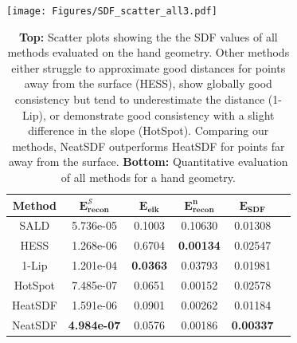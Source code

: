 \documentclass[draft,12pt,openany]{book}
\theoremstyle{plainnormal}
\theoremstyle{remark}
\begin{document}
\begin{table}
\hspace*{-0.3cm}
\texttt{[image: Figures/SDF\_scatter\_all3.pdf]}
\vspace*{0.5cm}  %
    \par  %
        \begin{tabular}{cccccc}
        \toprule
        \textbf{Method} &$\mathbf{E_{recon}^{\mathcal{S}}}$ & $\mathbf{E_{eik}}$ &$\mathbf{E_{recon}^n}$ & $\mathbf{E_{SDF}}$\\ 
        \midrule
        SALD & 5.736e-05 &  0.1003 & 0.10630 & 0.01308\\ %
        HESS & 1.268e-06  &  0.6704 &\textbf{0.00134} &0.02547   \\ 
        1-Lip   & 1.201e-04   & \textbf{0.0363} &0.03793&0.01981\\  %
        HotSpot  &7.485e-07 &   0.0651 & 0.00152 &  0.02578\\  %
        \midrule
        HeatSDF & 1.591e-06  & 0.0901 &  0.00262&0.01184\\  %
        
        NeatSDF & \textbf{4.984e-07} & 0.0576 & 0.00186 & \textbf{0.00337} \\%
        \bottomrule
    \end{tabular}
    \caption{\textbf{Top:} Scatter plots showing the the SDF values of all methods evaluated on the hand geometry. Other methods either struggle to approximate good distances for points away from the surface (HESS), show globally good consistency but tend to underestimate the distance (1-Lip), or demonstrate good consistency with a slight difference in the slope (HotSpot). Comparing our methods, NeatSDF outperforms HeatSDF for points far away from the surface. \textbf{Bottom:} Quantitative evaluation of all methods for a hand geometry.}
    \label{tab:handquant}
\end{table}
        
\end{document}
